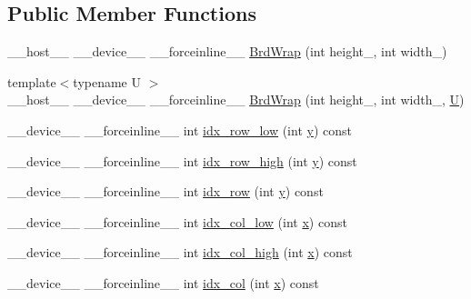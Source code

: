 \subsection*{Public Member Functions}
\begin{DoxyCompactItemize}
\item 
\-\_\-\-\_\-host\-\_\-\-\_\- \-\_\-\-\_\-device\-\_\-\-\_\- \-\_\-\-\_\-forceinline\-\_\-\-\_\- \hyperlink{structcv_1_1gpu_1_1device_1_1BrdWrap_aae298e61eb064346e51e95cfaf168a63}{Brd\-Wrap} (int height\-\_\-, int width\-\_\-)
\item 
{\footnotesize template$<$typename U $>$ }\\\-\_\-\-\_\-host\-\_\-\-\_\- \-\_\-\-\_\-device\-\_\-\-\_\- \-\_\-\-\_\-forceinline\-\_\-\-\_\- \hyperlink{structcv_1_1gpu_1_1device_1_1BrdWrap_aa8780d415c9e06e078839dd719d034c6}{Brd\-Wrap} (int height\-\_\-, int width\-\_\-, \hyperlink{core__c_8h_aa9c521f41af9a5191e5e4b6ffbae211a}{U})
\item 
\-\_\-\-\_\-device\-\_\-\-\_\- \-\_\-\-\_\-forceinline\-\_\-\-\_\- int \hyperlink{structcv_1_1gpu_1_1device_1_1BrdWrap_ae8fd429e1ba5cda540a9fe7d13d06e1a}{idx\-\_\-row\-\_\-low} (int \hyperlink{highgui__c_8h_af1202c02b14870c18fb3a1da73e9e7c7}{y}) const 
\item 
\-\_\-\-\_\-device\-\_\-\-\_\- \-\_\-\-\_\-forceinline\-\_\-\-\_\- int \hyperlink{structcv_1_1gpu_1_1device_1_1BrdWrap_aadbd879323ef3f4ce9208559af80e4ac}{idx\-\_\-row\-\_\-high} (int \hyperlink{highgui__c_8h_af1202c02b14870c18fb3a1da73e9e7c7}{y}) const 
\item 
\-\_\-\-\_\-device\-\_\-\-\_\- \-\_\-\-\_\-forceinline\-\_\-\-\_\- int \hyperlink{structcv_1_1gpu_1_1device_1_1BrdWrap_a839f4e754fa757cc1900200584164f52}{idx\-\_\-row} (int \hyperlink{highgui__c_8h_af1202c02b14870c18fb3a1da73e9e7c7}{y}) const 
\item 
\-\_\-\-\_\-device\-\_\-\-\_\- \-\_\-\-\_\-forceinline\-\_\-\-\_\- int \hyperlink{structcv_1_1gpu_1_1device_1_1BrdWrap_abcff54686d9434629cbf45b2798f28e7}{idx\-\_\-col\-\_\-low} (int \hyperlink{highgui__c_8h_a6150e0515f7202e2fb518f7206ed97dc}{x}) const 
\item 
\-\_\-\-\_\-device\-\_\-\-\_\- \-\_\-\-\_\-forceinline\-\_\-\-\_\- int \hyperlink{structcv_1_1gpu_1_1device_1_1BrdWrap_aba56b55700b5b3136a08878a9f108ffd}{idx\-\_\-col\-\_\-high} (int \hyperlink{highgui__c_8h_a6150e0515f7202e2fb518f7206ed97dc}{x}) const 
\item 
\-\_\-\-\_\-device\-\_\-\-\_\- \-\_\-\-\_\-forceinline\-\_\-\-\_\- int \hyperlink{structcv_1_1gpu_1_1device_1_1BrdWrap_a865b88834627d1c335eea0d3d5d1d7a6}{idx\-\_\-col} (int \hyperlink{highgui__c_8h_a6150e0515f7202e2fb518f7206ed97dc}{x}) const 

\end{DoxyCompactItemize}
